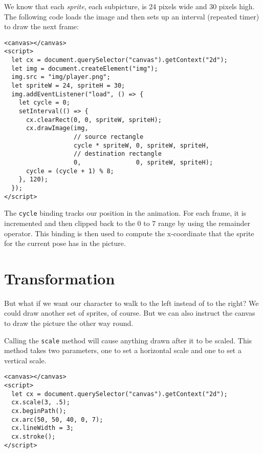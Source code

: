We know that each \emph{sprite}, each subpicture, is 24 pixels wide and 30 pixels high. The following code loads the image and then sets up an interval (repeated timer) to draw the next frame:

\begin{lstlisting}
<canvas></canvas>
<script>
  let cx = document.querySelector("canvas").getContext("2d");
  let img = document.createElement("img");
  img.src = "img/player.png";
  let spriteW = 24, spriteH = 30;
  img.addEventListener("load", () => {
    let cycle = 0;
    setInterval(() => {
      cx.clearRect(0, 0, spriteW, spriteH);
      cx.drawImage(img,
                   // source rectangle
                   cycle * spriteW, 0, spriteW, spriteH,
                   // destination rectangle
                   0,               0, spriteW, spriteH);
      cycle = (cycle + 1) % 8;
    }, 120);
  });
</script>
\end{lstlisting}
\noindent{}

The \lstinline`cycle` binding tracks our position in the animation. For each frame, it is incremented and then clipped back to the 0 to 7 range by using the remainder operator. This binding is then used to compute the x-coordinate that the sprite for the current pose has in the picture.

\section{Transformation}

But what if we want our character to walk to the left instead of to the right? We could draw another set of sprites, of course. But we can also instruct the canvas to draw the picture the other way round.

Calling the \lstinline`scale` method will cause anything drawn after it to be scaled. This method takes two parameters, one to set a horizontal scale and one to set a vertical scale.

\begin{lstlisting}
<canvas></canvas>
<script>
  let cx = document.querySelector("canvas").getContext("2d");
  cx.scale(3, .5);
  cx.beginPath();
  cx.arc(50, 50, 40, 0, 7);
  cx.lineWidth = 3;
  cx.stroke();
</script>
\end{lstlisting}
\noindent

